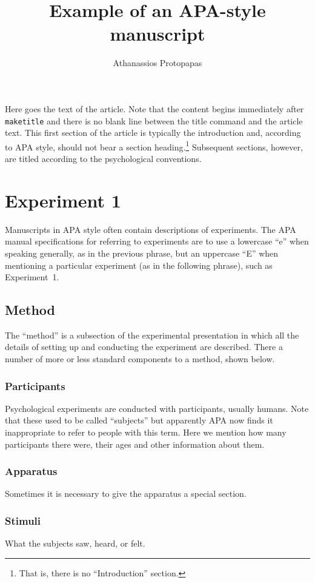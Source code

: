 \documentclass[man]{apa}
\title{Example of an APA-style manuscript}
\author{Athanassios Protopapas}
\affiliation{Institute for Language \& Speech Processing\\ Athens, Greece}
\begin{document}
\maketitle                            
Here goes the text of the article. Note that the content begins immediately after \texttt{maketitle} and there is no blank line between the title command and the article text. This first section of the article is typically the introduction and, according to APA style, should not bear a section heading.\footnote{That is, there is no ``Introduction'' section.} Subsequent sections, however, are titled according to the psychological conventions.

\section{Experiment 1} 
Manuscripts in APA style often contain descriptions of experiments.  The APA manual specifications for referring to experiments are to use a lowercase ``e'' when speaking generally, as in the previous phrase, but an uppercase ``E'' when mentioning a particular experiment (as in the following phrase), such as Experiment~1.

\subsection{Method}
The ``method'' is a subsection of the experimental presentation in which all the details of setting up and conducting the experiment are described.  There a number of more or less standard components to a method, shown below.
\subsubsection{Participants}
Psychological experiments are conducted with participants, usually humans. Note that these used to be called ``subjects'' but apparently APA now finds it inappropriate to refer to people with this term.  Here we mention how many participants there were, their ages and other information about them.
\subsubsection{Apparatus}
Sometimes it is necessary to give the apparatus a special section.
\subsubsection{Stimuli}
What the subjects saw, heard, or felt.
\end{document}
